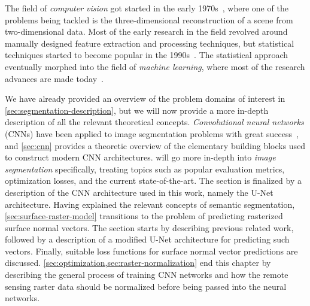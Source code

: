 The field of \textit{computer vision} got started in the early 1970s~\cite[p.~10]{computer_vision_history}, where one of the problems being tackled is the three-dimensional reconstruction of a scene from two-dimensional data.
Most of the early research in the field revolved around manually designed feature extraction and processing techniques, but statistical techniques started to become popular in the 1990s~\cite[p.~15]{computer_vision_history}.
The statistical approach eventually morphed into the field of \textit{machine learning}, where most of the research advances are made today~\cite[p.~17]{computer_vision_history}.

We have already provided an overview of the problem domains of interest in \cref{sec:segmentation-description}, but we will now provide a more in-depth description of all the relevant theoretical concepts.
\textit{Convolutional neural networks} (CNNs) have been applied to image segmentation problems with great success~\cite[p.~1]{image_recognition}, and \cref{sec:cnn} provides a theoretic overview of the elementary building blocks used to construct modern CNN architectures.
 will go more in-depth into \emph{image segmentation} specifically, treating topics such as popular evaluation metrics, optimization losses, and the current state-of-the-art.
The section is finalized by a description of the CNN architecture used in this work, namely the U-Net architecture.
Having explained the relevant concepts of semantic segmentation, \cref{sec:surface-raster-model} transitions to the problem of predicting rasterized surface normal vectors.
The section starts by describing previous related work, followed by a description of a modified U-Net architecture for predicting such vectors.
Finally, suitable loss functions for surface normal vector predictions are discussed.
\cref{sec:optimization,sec:raster-normalization} end this chapter by describing the general process of training CNN networks and how the remote sensing raster data should be normalized before being passed into the neural networks.
